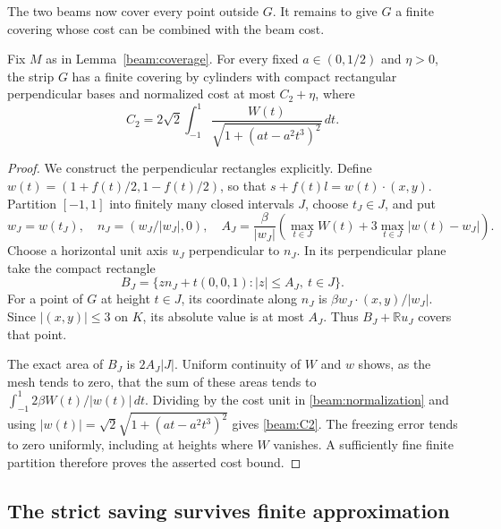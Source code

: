 The two beams now cover every point outside $G$. It remains to give
$G$ a finite covering whose cost can be combined with the beam cost.
\begin{lemma}\label{beam:finite-strip}
Fix $M$ as in Lemma~\ref{beam:coverage}. For every fixed $a\in(0,1/2)$
and $\eta>0$, the strip $G$ has a finite covering by cylinders with
compact rectangular perpendicular bases and normalized cost at most
$C_2+\eta$, where
\begin{equation}\label{beam:C2}
 C_2=2\sqrt{2}\int_{-1}^{1}
       \frac{W(t)}{\sqrt{1+(at-a^2t^3)^2}}\,dt.
\end{equation}
\end{lemma}
\begin{proof}
We construct the perpendicular rectangles explicitly. Define
$w(t)=(1+f(t)/2,1-f(t)/2)$, so that $s+f(t)l=w(t)\cdot(x,y)$.
Partition $[-1,1]$ into finitely many closed intervals $J$, choose
$t_J\in J$, and put
\[
 w_J=w(t_J),\quad n_J=(w_J/|w_J|,0),\quad
 A_J=\frac{\beta}{|w_J|}
 \left(\max_{t\in J}W(t)+3\max_{t\in J}|w(t)-w_J|\right).
\]
Choose a horizontal unit axis $u_J$ perpendicular to $n_J$. In its
perpendicular plane take the compact rectangle
\[
 B_J=\{z n_J+t(0,0,1): |z|\le A_J,\ t\in J\}.
\]
For a point of $G$ at height $t\in J$, its coordinate along $n_J$ is
$\beta w_J\cdot(x,y)/|w_J|$. Since $|(x,y)|\le3$ on $K$, its absolute
value is at most $A_J$. Thus $B_J+\mathbb R u_J$ covers that point.

The exact area of $B_J$ is $2A_J|J|$. Uniform continuity of $W$ and $w$
shows, as the mesh tends to zero, that the sum of these areas tends to
$\int_{-1}^{1}2\beta W(t)/|w(t)|\,dt$. Dividing by the cost unit in
\eqref{beam:normalization} and using
$|w(t)|=\sqrt{2}\sqrt{1+(at-a^2t^3)^2}$ gives
\eqref{beam:C2}. The freezing error tends to zero uniformly, including
at heights where $W$ vanishes. A sufficiently fine finite partition
therefore proves the asserted cost bound.
\end{proof}

\subsection{The strict saving survives finite approximation}\label{beam:cost-comparison}

